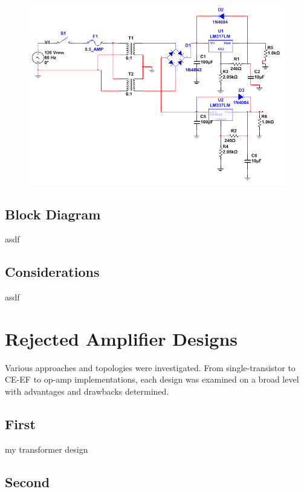 \documentclass[journal]{IEEEtran}
\begin{document}
\begin{figure}[H]
\centering
\includegraphics[scale=.4]{final-psu.png}
\label{fig_psu_schem}
\end{figure}

\subsection{Block Diagram}

asdf

\subsection{Considerations}

asdf

\section{Rejected Amplifier Designs}

Various approaches and topologies were investigated. From single-transistor to CE-EF to op-amp implementations, each design was examined on a broad level with advantages and drawbacks determined.

\subsection{First}

my transformer design

\subsection{Second}
\end{document}
